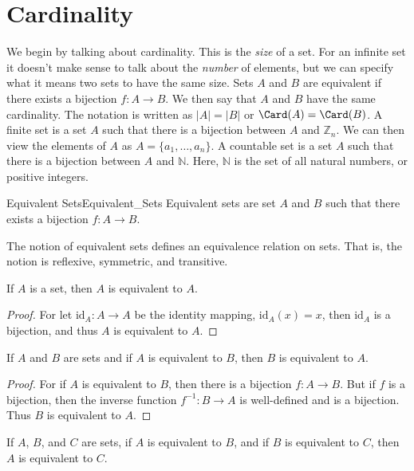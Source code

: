 \section{Cardinality}
    We begin by talking about cardinality. This is the \textit{size} of a set.
    For an infinite set it doesn't make sense to talk about the \textit{number}
    of elements, but we can specify what it means two sets to have the same
    size. Sets $A$ and $B$ are equivalent if there exists a bijection
    $f:A\rightarrow{B}$. We then say that $A$ and $B$ have the same cardinality.
    The notation is written as $|A|=|B|$ or $\Card(A)=\Card(B)$. A finite set is
    a set $A$ such that there is a bijection between $A$ and $\mathbb{Z}_{n}$.
    We can then view the elements of $A$ as $A=\{a_{1},\hdots,a_{n}\}$. A
    countable set is a set $A$ such that there is a bijection between $A$ and
    $\mathbb{N}$. Here, $\mathbb{N}$ is the set of all natural numbers, or
    positive integers.
    \begin{ldefinition}{Equivalent Sets}{Equivalent_Sets}
        Equivalent sets are set $A$ and $B$ such that there exists a bijection
        $f:A\rightarrow{B}$.
    \end{ldefinition}
    The notion of equivalent sets defines an equivalence relation on sets. That
    is, the notion is reflexive, symmetric, and transitive.
    \begin{theorem}
        If $A$ is a set, then $A$ is equivalent to $A$.
    \end{theorem}
    \begin{proof}
        For let $\mathrm{id}_{A}:A\rightarrow{A}$ be the identity mapping,
        $\mathrm{id}_{A}(x)=x$, then $\mathrm{id}_{A}$ is a bijection, and thus
        $A$ is equivalent to $A$.
    \end{proof}
    \begin{theorem}
        If $A$ and $B$ are sets and if $A$ is equivalent to $B$, then $B$ is
        equivalent to $A$.
    \end{theorem}
    \begin{proof}
        For if $A$ is equivalent to $B$, then there is a bijection
        $f:A\rightarrow{B}$. But if $f$ is a bijection, then the inverse
        function $f^{-1}:B\rightarrow{A}$ is well-defined and is a bijection.
        Thus $B$ is equivalent to $A$.
    \end{proof}
    \begin{theorem}
        If $A$, $B$, and $C$ are sets, if $A$ is equivalent to $B$, and if $B$
        is equivalent to $C$, then $A$ is equivalent to $C$.
    \end{theorem}
